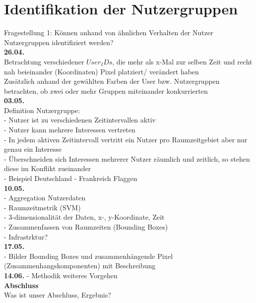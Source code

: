 \section{Identifikation der Nutzergruppen} \label{question1}  %

Fragestellung 1: K{\"o}nnen anhand von {\"a}hnlichen Verhalten der Nutzer Nutzergruppen identifiziert werden?\\

\textbf{26.04.}\\
Betrachtung verschiedener $User_IDs$, die mehr als x-Mal zur selben Zeit und recht nah beieinander (Koordinaten) Pixel platziert/ ver{\"a}ndert haben\\
Zusätzlich anhand der gew{\"a}hlten Farben der User bzw. Nutzergruppen betrachten, ob zwei oder mehr Gruppen miteinander konkurrierten\\
\textbf{03.05.}\\
Definition Nutzergruppe:\\
- Nutzer ist zu verschiedenen Zeitintervallen aktiv\\
- Nutzer kann mehrere Interessen vertreten\\
- In jedem aktiven Zeitintervall vertritt ein Nutzer pro Raumzeitgebiet aber nur genau ein Interesse\\
- {\"U}berschneiden sich Interessen mehrerer Nutzer r{\"a}umlich und zeitlich, so stehen diese im Konflikt zueinander\\
- Beispiel Deutschland - Frankreich Flaggen\\
\textbf{10.05.}\\
- Aggregation Nutzerdaten\\
- Raumzeitmetrik (SVM)\\
- 3-dimensionalit{\"a}t der Daten, x-, y-Koordinate, Zeit\\
- Zusammenfassen von Raumzeiten (Bounding Boxes)\\
- Infrastrktur?\\
\textbf{17.05.}\\
- Bilder Bounding Boxes und zusammenh{\"a}ngende Pixel (Zusammenhangskomponenten) mit Beschreibung\\

\textbf{14.06.}
- Methodik weiteres Vorgehen\\

\textbf{Abschluss}\\
Was ist unser Abschluss, Ergebnis?


